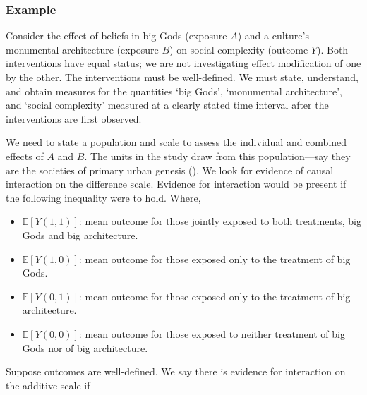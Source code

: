 \documentclass[
  single column]{article}
\providecommand{\tightlist}{%
  \setlength{\itemsep}{0pt}\setlength{\parskip}{0pt}}\usepackage{longtable,booktabs,array}
\begin{document}
\begin{table}

\caption{\label{tbl-interactionpuzzle}}

\centering{

\captionsetup{labelsep=none}

\interactionpuzzle

}

\end{table}%

\subsubsection{Example}\label{example}

Consider the effect of beliefs in big Gods (exposure \(A\)) and a
culture's monumental architecture (exposure \(B\)) on social complexity
(outcome \(Y\)). Both interventions have equal status; we are not
investigating effect modification of one by the other. The interventions
must be well-defined. We must state, understand, and obtain measures for
the quantities `big Gods', `monumental architecture', and `social
complexity' measured at a clearly stated time interval after the
interventions are first observed.

We need to state a population and scale to assess the individual and
combined effects of \(A\) and \(B\). The units in the study draw from
this population---say they are the societies of primary urban genesis
(). We look for evidence
of causal interaction on the difference scale. Evidence for interaction
would be present if the following inequality were to hold. Where,

\begin{itemize}
\tightlist
\item
  \(\mathbb{E}[Y(1,1)]\): mean outcome for those jointly exposed to both
  treatments, big Gods and big architecture.
\item
  \(\mathbb{E}[Y(1,0)]\): mean outcome for those exposed only to the
  treatment of big Gods.
\item
  \(\mathbb{E}[Y(0,1)]\): mean outcome for those exposed only to the
  treatment of big architecture.
\item
  \(\mathbb{E}[Y(0,0)]\): mean outcome for those exposed to neither
  treatment of big Gods nor of big architecture.
\end{itemize}

Suppose outcomes are well-defined. We say there is evidence for
interaction on the additive scale if
\end{document}
